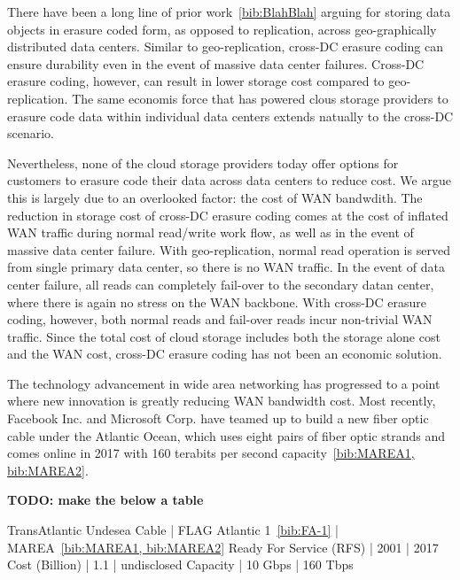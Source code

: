 There have been a long line of prior work~\ref{bib:BlahBlah} arguing for storing data objects in erasure coded form, as opposed to replication, across geo-graphically distributed data centers. Similar to geo-replication, cross-DC erasure coding can ensure durability even in the event of massive data center failures. Cross-DC erasure coding, however, can result in lower storage cost compared to geo-replication. The same economis force that has powered clous storage providers to erasure code data within individual  data centers extends natually to the cross-DC scenario.

Nevertheless, none of the cloud storage providers today offer options for customers to erasure code their data across data centers to reduce cost. We argue this is largely due to an overlooked factor: the cost of WAN bandwdith. The reduction in storage cost of cross-DC erasure coding comes at the cost of inflated WAN traffic during normal read/write work flow, as well as in the event of massive data center failure. With geo-replication, normal read operation is served from single primary data center, so there is no WAN traffic. In the event of data center failure, all reads can completely fail-over to the secondary datan center, where there is again no stress on the WAN backbone. With cross-DC erasure coding, however, both normal reads and fail-over reads incur non-trivial WAN traffic. Since the total cost of cloud storage includes both the storage alone cost and the WAN cost, cross-DC erasure coding has not been an economic solution.

The technology advancement in wide area networking has progressed to a point where new innovation is greatly reducing WAN bandwidth cost. Most recently, Facebook Inc. and Microsoft Corp. have teamed up to build a new fiber optic cable under the Atlantic Ocean, which uses eight pairs of fiber optic strands and comes online in 2017 with 160 terabits per second capacity~\ref{bib:MAREA1, bib:MAREA2}.

{\bf TODO: make the below a table}

TransAtlantic Undesea Cable     | FLAG Atlantic 1~\ref{bib:FA-1}    | MAREA~\ref{bib:MAREA1, bib:MAREA2}
Ready For Service (RFS)         | 2001                              | 2017
Cost (Billion)                  | 1.1                               | undisclosed
Capacity                        | 10 Gbps                           | 160 Tbps


